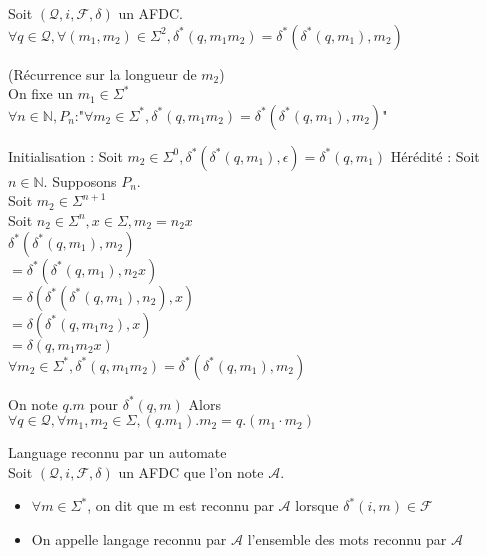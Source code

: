 \begin{prop}
    Soit $(\mathcal{Q},i,\mathcal{F},\delta)$ un AFDC.\\
    $\forall q \in \mathcal{Q}, \forall(m_1,m_2)\in \Sigma^2, \delta^*(q,m_1m_2)=\delta^*(\delta^*(q,m_1),m_2)$
\end{prop}

\begin{dem}
    (Récurrence sur la longueur de $m_2$)\\
    On fixe un $m_1 \in \Sigma^*$\\
    $\forall n \in \mathbb{N}, P_n$:"$\forall m_2 \in \Sigma^*,\delta^*(q,m_1m_2)= \delta^*(\delta^*(q,m_1),m_2)$"

    Initialisation : Soit $m_2 \in \Sigma^0, \delta^*(\delta^*(q,m_1),\epsilon) = \delta^*(q,m_1)$
    Hérédité : Soit $n \in \mathbb{N}$. Supposons $P_n$.\\
    Soit $m_2\in \Sigma^{n+1}$\\
    Soit $n_2\in \Sigma^{n}, x \in \Sigma, m_2=n_2x$\\
    $\delta^*(\delta^*(q,m_1),m_2)$\\
    $=\delta^*(\delta^*(q,m_1),n_2x)$\\
    $=\delta(\delta^*(\delta^*(q,m_1),n_2),x)$\\
    $=\delta(\delta^*(q,m_1n_2),x)$\\
    $=\delta(q,m_1m_2x)$\\

    $\forall m_2 \in \Sigma^*,\delta^*(q,m_1m_2)= \delta^*(\delta^*(q,m_1),m_2)$\\
\end{dem}

\begin{rmq}
    On note $q.m$ pour $\delta^*(q,m)$
    Alors $\forall q \in \mathcal{Q},\forall m_1,m_2 \in \Sigma, (q.m_1).m_2=q.(m_1\cdot m_2)$
\end{rmq}

\begin{defi}
    Language reconnu par un automate\\
    Soit $(\mathcal{Q},i,\mathcal{F},\delta)$ un AFDC que l'on note $\mathcal{A}$.\\
    \begin{itemize}
        \item $\forall m \in \Sigma^*$, on dit que m est reconnu par $\mathcal{A}$ lorsque $\delta^*(i,m) \in \mathcal{F}$
        \item On appelle langage reconnu par $\mathcal{A}$ l'ensemble des mots reconnu par $\mathcal{A}$
    \end{itemize}
\end{defi}

